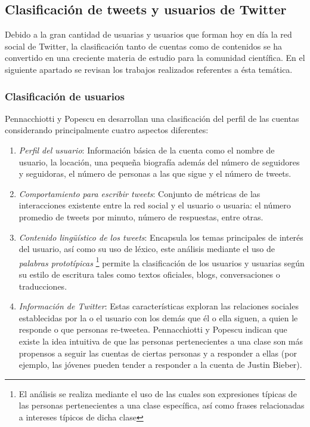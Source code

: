 \subsection{Clasificación de tweets y usuarios de Twitter}

Debido a la gran cantidad de usuarias y usuarios que forman hoy en día la red social de Twitter, la clasificación tanto de cuentas como de contenidos se ha convertido en una creciente materia de estudio para la comunidad científica. En el siguiente apartado se revisan los trabajos realizados referentes a ésta temática.

\subsubsection{Clasificación de usuarios}
   
     Pennacchiotti y Popescu en \cite{PennacchiottiP11} desarrollan una clasificación del perfil de las cuentas considerando principalmente cuatro aspectos diferentes:

    \begin{enumerate}
        \item \emph{Perfil del usuario}: Información básica de la cuenta como el nombre de usuario, la locación, una pequeña biografía además del número de seguidores y seguidoras, el número de personas a las que sigue  y el número de tweets. 
        
        \item \emph{Comportamiento para escribir tweets}:  Conjunto de métricas de las interacciones
        existente entre la red social y el usuario o usuaria: el número promedio de tweets por minuto, número de respuestas, entre otras. 
        
        \item \emph{Contenido lingüístico de los tweets}: Encapsula los temas principales de interés del usuario, así como su uso de léxico, este análisis mediante el uso de \emph{palabras prototípicas} \footnote{ El análisis se realiza mediante el uso de las cuales son expresiones típicas de las personas pertenecientes a una clase específica, así como frases relacionadas a intereses típicos de dicha clase} permite la clasificación de los usuarios y usuarias según su estilo de escritura tales como textos oficiales, blogs, conversaciones o traducciones.
       
        \item \emph{Información de Twitter}: Estas características exploran las relaciones sociales establecidas por
        la o el usuario con los demás que él o ella siguen, a quien le responde o que personas re-tweetea.          Pennacchiotti y Popescu indican que existe la idea intuitiva de que las personas pertenecientes a una clase son más propensos a seguir las cuentas de ciertas personas y a responder a ellas (por ejemplo, las jóvenes pueden tender a responder a la cuenta de Justin Bieber).
       
    \end{enumerate}

